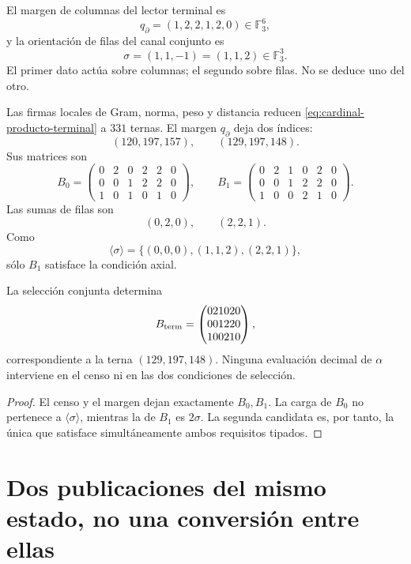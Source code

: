 El margen de columnas del lector terminal es
\[
 q_\partial=(1,2,2,1,2,0)\in\mathbb F_3^6,
\]
y la orientación de filas del canal conjunto es
\[
 \sigma=(1,1,-1)=(1,1,2)\in\mathbb F_3^3.
\]
El primer dato actúa sobre columnas; el segundo sobre filas. No se deduce
uno del otro.

Las firmas locales de Gram, norma, peso y distancia reducen
\eqref{eq:cardinal-producto-terminal} a \(331\) ternas. El margen
\(q_\partial\) deja dos índices:
\[
 (120,197,157),
 \qquad
 (129,197,148).
\]
Sus matrices son
\[
 B_0=
 \begin{pmatrix}
 0&2&0&2&2&0\\
 0&0&1&2&2&0\\
 1&0&1&0&1&0
 \end{pmatrix},
 \qquad
 B_1=
 \begin{pmatrix}
 0&2&1&0&2&0\\
 0&0&1&2&2&0\\
 1&0&0&2&1&0
 \end{pmatrix}.
\]
Las sumas de filas son
\[
 (0,2,0),
 \qquad
 (2,2,1).
\]
Como
\[
 \langle\sigma\rangle
 =\{(0,0,0),(1,1,2),(2,2,1)\},
\]
sólo \(B_1\) satisface la condición axial.

\begin{theorem}
\label{thm:unicidad-publicacion-terminal-visible}
La selección conjunta determina
\begin{equation}
 B_{\rm term}=
 \begin{pmatrix}
 021020\\001220\\100210
 \end{pmatrix},
 \label{eq:matriz-terminal-visible}
\end{equation}
correspondiente a la terna \((129,197,148)\). Ninguna evaluación decimal de
\(\alpha\) interviene en el censo ni en las dos condiciones de selección.
\end{theorem}

\begin{proof}
El censo y el margen dejan exactamente \(B_0,B_1\). La carga de \(B_0\)
no pertenece a \(\langle\sigma\rangle\), mientras la de \(B_1\) es
\(2\sigma\). La segunda candidata es, por tanto, la única que satisface
simultáneamente ambos requisitos tipados.
\end{proof}

\section{Dos publicaciones del mismo estado, no una conversión entre ellas}

